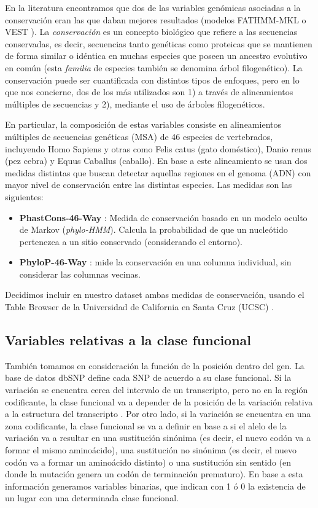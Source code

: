 En la literatura encontramos que dos de las variables genómicas asociadas a la conservación eran las que daban mejores resultados (modelos FATHMM-MKL \cite{Shihab2015} o VEST \cite{Carter2013}). La \textit{conservación} es un concepto biológico que refiere a las secuencias conservadas, es decir, secuencias tanto genéticas como proteicas que se mantienen de forma similar o idéntica en muchas especies que poseen un ancestro evolutivo en común (esta \textit{familia} de especies también se denomina árbol filogenético). La conservación puede ser cuantificada con distintos tipos de enfoques, pero en lo que nos concierne, dos de los más utilizados son 1) a través de alineamientos múltiples de secuencias y 2), mediante el uso de árboles filogenéticos.

En particular, la composición de estas variables consiste en alineamientos múltiples de secuencias genéticas (MSA) de 46 especies de vertebrados, incluyendo Homo Sapiens y otras como Felis catus (gato doméstico), Danio renus (pez cebra) y Equus Caballus (caballo). En base a este alineamiento se usan dos medidas distintas que buscan detectar aquellas regiones en el genoma (ADN) con mayor nivel de conservación entre las distintas especies. Las medidas son las siguientes:
\begin{itemize}
    \item \textbf{PhastCons-46-Way} \cite{siepel2005evolutionarily}: Medida de conservación basado en un modelo oculto de Markov (\textit{phylo-HMM}). Calcula la probabilidad de que un nucleótido pertenezca a un sitio conservado (considerando el entorno).
    \item \textbf{PhyloP-46-Way} \cite{Pollard2010}: mide la conservación en una columna individual, sin considerar las columnas vecinas.
\end{itemize}

Decidimos incluir en nuestro dataset ambas medidas de conservación, usando el Table Browser de la Universidad de California en Santa Cruz (UCSC) \cite{Karolchik2004}.

\subsection{Variables relativas a la clase funcional}

También tomamos en consideración la función de la posición dentro del gen. La base de datos dbSNP define cada SNP de acuerdo a su clase funcional. Si la variación se encuentra cerca del intervalo de un transcripto, pero no en la región codificante, la clase funcional va a depender de la posición de la variación relativa a la estructura del transcripto \cite{Ostell2007}.  Por otro lado, si la variación se encuentra en una zona codificante, la clase funcional se va a definir en base a si el alelo de la variación va a resultar en una sustitución sinónima (es decir, el nuevo codón va a formar el mismo aminoácido), una sustitución no sinónima (es decir, el nuevo codón va a formar un aminoácido distinto) o una sustitución sin sentido (en donde la mutación genera un codón de terminación prematuro). En base a esta información generamos variables binarias, que indican con 1 ó 0 la existencia de un lugar con una determinada clase funcional.



